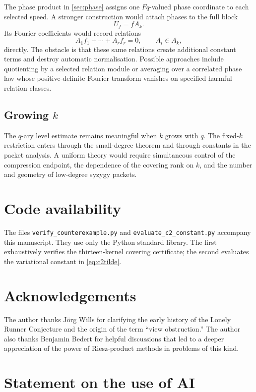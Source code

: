 \documentclass[11pt,reqno]{amsart}
\numberwithin{equation}{section}
\theoremstyle{definition}
\theoremstyle{remark}
\newcommand{\Fq}{\mathbb F_q}
\def\Fq{Fq}%
\def\mathbb#1{#1}%
\begin{document}
The phase product in \cref{sec:phase} assigns one $\Fq$-valued phase coordinate to each selected speed.  A stronger construction would attach phases to the full block
\[
 U_f=fA_k.
\]
Its Fourier coefficients would record relations
\[
 A_1f_1+\cdots+A_rf_r=0,
 \qquad
 A_i\in A_k,
\]
directly.  The obstacle is that these same relations create additional constant terms and destroy automatic normalisation.  Possible approaches include quotienting by a selected relation module or averaging over a correlated phase law whose positive-definite Fourier transform vanishes on specified harmful relation classes.

\subsection{Growing $k$}

The $q$-ary level estimate remains meaningful when $k$ grows with $q$.  The fixed-$k$ restriction enters through the small-degree theorem and through constants in the packet analysis.  A uniform theory would require simultaneous control of the compression endpoint, the dependence of the covering rank on $k$, and the number and geometry of low-degree syzygy packets.

\section*{Code availability}

The files \texttt{verify\_counterexample.py} and
\texttt{evaluate\_c2\_constant.py} accompany this manuscript.  They use only the Python standard library.  The first exhaustively verifies the thirteen-kernel covering certificate; the second evaluates the variational constant in \eqref{eq:c2tilde}.

\section*{Acknowledgements}

The author thanks J\"org Wills for clarifying the early history of the Lonely Runner Conjecture and the origin of the term ``view obstruction.''  The author also thanks Benjamin Bedert for helpful discussions that led to a deeper appreciation of the power of Riesz-product methods in problems of this kind.

\section*{Statement on the use of AI}
\end{document}
